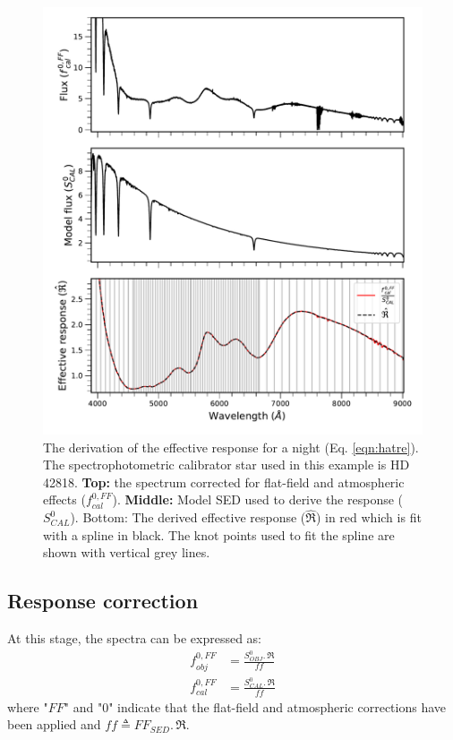 \begin{figure}[!ht]
\centering
\includegraphics[width=\hsize]{chapters/data_reduction/image/ResponseDerivation.pdf}
     \caption{The derivation of the effective response for a night (Eq. \ref{eqn:hatre}). The spectrophotometric calibrator star used in this example is HD 42818. \textbf{Top:} the spectrum corrected for flat-field and atmospheric effects ($ f_{cal}^{0,FF}$). \textbf{Middle:} Model SED used to derive the response ($S^0_{CAL}$). Bottom: The derived effective response ($\hat{\Re}$) in red which is fit with a spline in black. The knot points used to fit the spline are shown with vertical grey lines. }
     \label{fig:respDerivation}
\end{figure}

\subsection{Response correction}
\label{sec:responsecorr}

At this stage, the spectra can be expressed as:
    \begin{align}
    \label{eq:divff0obj}
    f_{obj}^{0,FF} &= \frac{S^0_{OBJ} .\, \Re}{ff}\\
    \label{eq:divff0cal}
    f_{cal}^{0,FF} &= \frac{S^0_{CAL} .\, \Re}{ff}
    \end{align}
where "$FF$" and "$0$" indicate that the flat-field and atmospheric corrections have been applied and $ff \triangleq FF_{SED} .\, \Re$.

